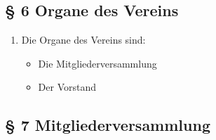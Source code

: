 ﻿\documentclass[10pt,a4paper]{scrartcl}
\begin{document}
\subsection*{§ 6 Organe des Vereins }
\begin{enumerate}
        \item Die Organe des Vereins sind:
                \begin{itemize}
                        \item Die Mitgliederversammlung
                        \item Der Vorstand
                \end{itemize}
\end{enumerate}
%
%
\subsection*{§ 7 Mitgliederversammlung}
\end{document}
